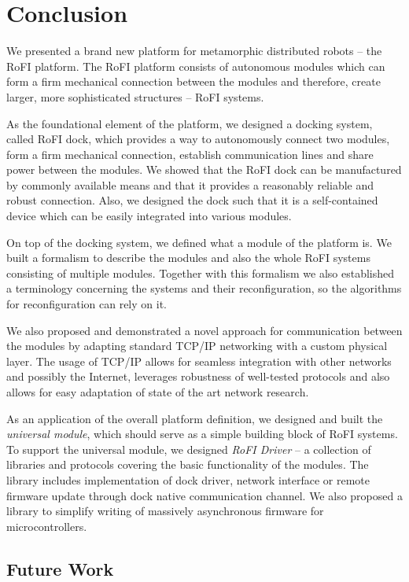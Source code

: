 \chapter{Conclusion}\label{chap:conclusion}

We presented a brand new platform for metamorphic distributed robots -- the RoFI
platform. The RoFI platform consists of autonomous modules which can form a
firm mechanical connection between the modules and therefore, create larger,
more sophisticated structures -- RoFI systems.

As the foundational element of the platform, we designed a docking system,
called RoFI dock, which provides a way to autonomously connect two modules, form
a firm mechanical connection, establish communication lines and share power
between the modules. We showed that the RoFI dock can be manufactured by
commonly available means and that it provides a reasonably reliable and robust
connection. Also, we designed the dock such that it is a self-contained device
which can be easily integrated into various modules.

On top of the docking system, we defined what a module of the platform is. We
built a formalism to describe the modules and also the whole RoFI systems
consisting of multiple modules. Together with this formalism we also established
a terminology concerning the systems and their reconfiguration, so the
algorithms for reconfiguration can rely on it.

We also proposed and demonstrated a novel approach for communication between the
modules by adapting standard TCP/IP networking with a custom physical layer. The
usage of TCP/IP allows for seamless integration with other networks and possibly
the Internet, leverages robustness of well-tested protocols and also allows for
easy adaptation of state of the art network research.

As an application of the overall platform definition, we designed and built the
\emph{universal module}, which should serve as a simple building block of RoFI
systems. To support the universal module, we designed \emph{RoFI Driver} -- a
collection of libraries and protocols covering the basic functionality of the
modules. The library includes implementation of dock driver, network interface
or remote firmware update through dock native communication channel. We also
proposed a library to simplify writing of massively asynchronous firmware for
microcontrollers.

\section{Future Work}

